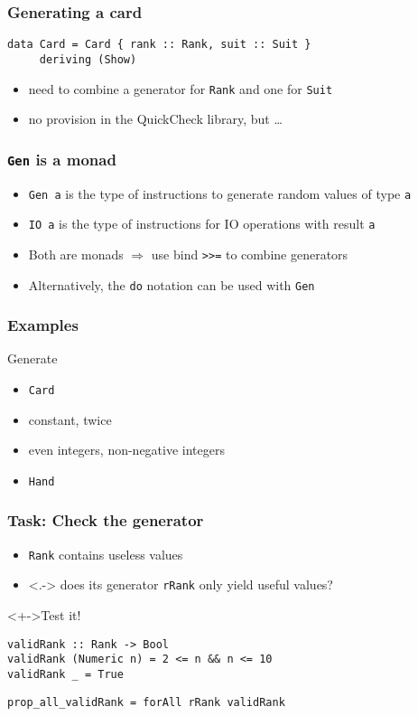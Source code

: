 \documentclass{beamer}
\begin{document}
\begin{frame}[fragile]
  \frametitle{Generating a card}
\begin{verbatim}
data Card = Card { rank :: Rank, suit :: Suit }
     deriving (Show)
\end{verbatim}
\begin{itemize}
\item need to combine a generator for \texttt{Rank} and one for \texttt{Suit}
\item no provision in the QuickCheck library, but \dots
\end{itemize}
\end{frame}
\begin{frame}[fragile]
  \frametitle{\texttt{Gen} is a monad}
  \begin{itemize}
  \item \texttt{Gen a} is the type of instructions to generate random values of type \texttt{a}
  \item \texttt{IO a} is the type of instructions for IO operations with result \texttt{a}
  \item Both are monads $\Rightarrow$ use bind \texttt{>>=} to combine generators
  \item Alternatively, the \texttt{do} notation can be used with \texttt{Gen}
  \end{itemize}
\end{frame}
\begin{frame}[fragile]
  \frametitle{Examples}
  Generate 
  \begin{itemize}
  \item \texttt{Card}
  \item constant, twice
  \item even integers, non-negative integers
  \item \texttt{Hand}
  \end{itemize}
\end{frame}
\begin{frame}[fragile]
  \frametitle{Task: Check the generator}
  \begin{itemize}
  \item<+-> \texttt{Rank} contains useless values
  \item<.-> does its generator \texttt{rRank} only yield useful values?
  \end{itemize}
  \begin{block}<+->{Test it!}
\begin{verbatim}
validRank :: Rank -> Bool
validRank (Numeric n) = 2 <= n && n <= 10
validRank _ = True
\end{verbatim}
\begin{verbatim}
prop_all_validRank = forAll rRank validRank
\end{verbatim}
  \end{block}
\end{frame}
\end{document}
